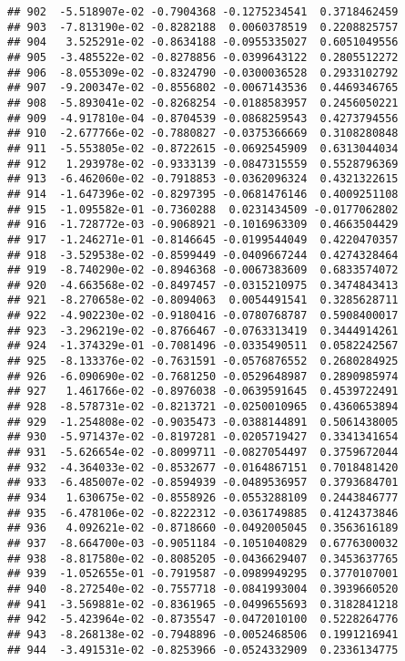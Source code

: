\documentclass[
]{article}
\begin{document}
\begin{verbatim}
## 902  -5.518907e-02 -0.7904368 -0.1275234541  0.3718462459
## 903  -7.813190e-02 -0.8282188  0.0060378519  0.2208825757
## 904   3.525291e-02 -0.8634188 -0.0955335027  0.6051049556
## 905  -3.485522e-02 -0.8278856 -0.0399643122  0.2805512272
## 906  -8.055309e-02 -0.8324790 -0.0300036528  0.2933102792
## 907  -9.200347e-02 -0.8556802 -0.0067143536  0.4469346765
## 908  -5.893041e-02 -0.8268254 -0.0188583957  0.2456050221
## 909  -4.917810e-04 -0.8704539 -0.0868259543  0.4273794556
## 910  -2.677766e-02 -0.7880827 -0.0375366669  0.3108280848
## 911  -5.553805e-02 -0.8722615 -0.0692545909  0.6313044034
## 912   1.293978e-02 -0.9333139 -0.0847315559  0.5528796369
## 913  -6.462060e-02 -0.7918853 -0.0362096324  0.4321322615
## 914  -1.647396e-02 -0.8297395 -0.0681476146  0.4009251108
## 915  -1.095582e-01 -0.7360288  0.0231434509 -0.0177062802
## 916  -1.728772e-03 -0.9068921 -0.1016963309  0.4663504429
## 917  -1.246271e-01 -0.8146645 -0.0199544049  0.4220470357
## 918  -3.529538e-02 -0.8599449 -0.0409667244  0.4274328464
## 919  -8.740290e-02 -0.8946368 -0.0067383609  0.6833574072
## 920  -4.663568e-02 -0.8497457 -0.0315210975  0.3474843413
## 921  -8.270658e-02 -0.8094063  0.0054491541  0.3285628711
## 922  -4.902230e-02 -0.9180416 -0.0780768787  0.5908400017
## 923  -3.296219e-02 -0.8766467 -0.0763313419  0.3444914261
## 924  -1.374329e-01 -0.7081496 -0.0335490511  0.0582242567
## 925  -8.133376e-02 -0.7631591 -0.0576876552  0.2680284925
## 926  -6.090690e-02 -0.7681250 -0.0529648987  0.2890985974
## 927   1.461766e-02 -0.8976038 -0.0639591645  0.4539722491
## 928  -8.578731e-02 -0.8213721 -0.0250010965  0.4360653894
## 929  -1.254808e-02 -0.9035473 -0.0388144891  0.5061438005
## 930  -5.971437e-02 -0.8197281 -0.0205719427  0.3341341654
## 931  -5.626654e-02 -0.8099711 -0.0827054497  0.3759672044
## 932  -4.364033e-02 -0.8532677 -0.0164867151  0.7018481420
## 933  -6.485007e-02 -0.8594939 -0.0489536957  0.3793684701
## 934   1.630675e-02 -0.8558926 -0.0553288109  0.2443846777
## 935  -6.478106e-02 -0.8222312 -0.0361749885  0.4124373846
## 936   4.092621e-02 -0.8718660 -0.0492005045  0.3563616189
## 937  -8.664700e-03 -0.9051184 -0.1051040829  0.6776300032
## 938  -8.817580e-02 -0.8085205 -0.0436629407  0.3453637765
## 939  -1.052655e-01 -0.7919587 -0.0989949295  0.3770107001
## 940  -8.272540e-02 -0.7557718 -0.0841993004  0.3939660520
## 941  -3.569881e-02 -0.8361965 -0.0499655693  0.3182841218
## 942  -5.423964e-02 -0.8735547 -0.0472010100  0.5228264776
## 943  -8.268138e-02 -0.7948896 -0.0052468506  0.1991216941
## 944  -3.491531e-02 -0.8253966 -0.0524332909  0.2336134775

\end{verbatim}
\end{document}
